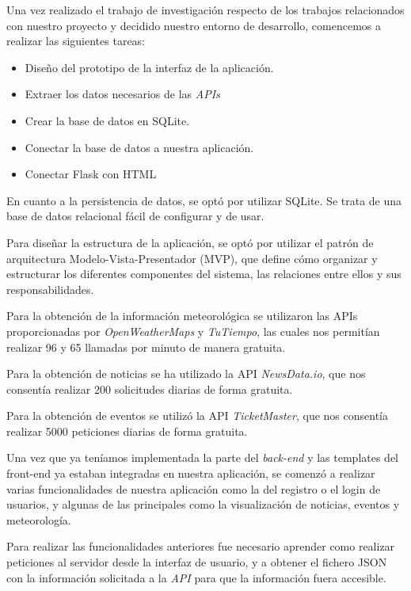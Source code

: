 Una vez realizado el trabajo de investigación respecto de los trabajos relacionados con nuestro proyecto y decidido nuestro entorno de desarrollo, comencemos a realizar las siguientes tareas:

\begin{itemize}
    \item Diseño del prototipo de la interfaz de la aplicación.
    \item Extraer los datos necesarios de las \textit{APIs}
    \item Crear la base de datos en SQLite.
    \item Conectar la base de datos a nuestra aplicación.
    \item Conectar Flask con HTML
\end{itemize}

En cuanto a la persistencia de datos, se optó por utilizar SQLite. Se trata de una base de datos relacional fácil de configurar y de usar. 


Para diseñar la estructura de la aplicación, se optó por utilizar el patrón de arquitectura Modelo-Vista-Presentador (MVP), que define cómo organizar y estructurar los diferentes componentes del sistema, las relaciones entre ellos y sus responsabilidades.

Para la obtención de la información meteorológica se utilizaron las APIs proporcionadas por \textit{OpenWeatherMaps} y \textit{TuTiempo}, las cuales nos permitían realizar 96 y 65 llamadas por minuto de manera gratuita.

Para la obtención de noticias se ha utilizado la API \textit{NewsData.io}, que nos consentía realizar 200 solicitudes diarias de forma gratuita. 

Para la obtención de eventos se utilizó la API \textit{TicketMaster}, que nos consentía  realizar 5000 peticiones diarias de forma gratuita.

Una vez que ya teníamos implementada la parte del \textit{back-end} y las templates del front-end ya estaban integradas en nuestra aplicación, se comenzó a realizar varias funcionalidades de nuestra aplicación como la del registro o el login de usuarios, y algunas de las principales como la visualización de noticias, eventos y meteorología.

Para realizar las funcionalidades anteriores fue necesario aprender como realizar peticiones al servidor desde la interfaz de usuario, y a obtener el fichero JSON con la información solicitada a la \textit{API} para que la información fuera accesible.

